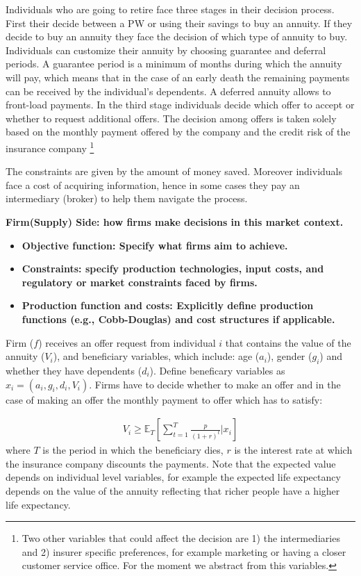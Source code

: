\documentclass[12pt]{article}
\theoremstyle{plain}
\theoremstyle{plain}
\begin{document}
Individuals who are going to retire  face three stages in their decision process. First their decide between a PW or using their savings to buy an annuity. If they decide to buy an annuity they face the decision of  which type of annuity to buy. Individuals can customize their annuity by choosing  guarantee and deferral periods. A guarantee period is a minimum of months during which the annuity will pay, which means that in the case of an early death the remaining payments can be received by the individual's dependents. A deferred annuity allows to front-load payments. In the third stage individuals decide which offer to accept or whether to request additional offers. The decision among offers is taken solely based on the monthly payment offered by the company and the credit risk of the insurance company \footnote{Two other variables that could affect the decision are 1) the intermediaries and 2) insurer specific preferences, for example marketing or having a closer customer service office. For the moment we abstract from this variables.}

The constraints are given by the amount of money saved. Moreover individuals face a cost of acquiring information, hence in some cases they pay an intermediary (broker) to help them navigate the process. 


\textbf{Firm(Supply) Side: how firms make decisions in this market context.}
 \begin{itemize}
     \item \textbf{Objective function: Specify what firms aim to achieve. }

     \item \textbf{Constraints:   specify production technologies, input costs, and regulatory or market constraints faced by firms.}

     \item \textbf{Production function and costs: Explicitly define production functions (e.g., Cobb-Douglas) and cost structures if applicable.}
 \end{itemize}

 Firm ($f$) receives an offer request from individual $i$ that contains the value of the annuity ($V_i$), and beneficiary variables, which include: age ($a_i$), gender ($g_i$) and whether they have dependents ($d_i$). Define beneficary variables as $x_i = (a_i, g_i, d_i, V_i)$.  Firms have to decide whether to make an offer and in the case of making an offer the monthly payment to offer which has to satisfy: 
 
 \begin{align*}
     V_i \geq \mathbb{E}_{T}\left[\sum_{t=1}^T\frac{p}{(1+r)^t}| x_i\right]
 \end{align*}
 where $T$ is the period in which the beneficiary dies, $r$ is the interest rate at which the insurance company discounts the payments. Note that the expected value depends on individual level variables, for example the expected life expectancy depends on the value of the annuity reflecting that richer people have a higher life expectancy.
\end{document}
